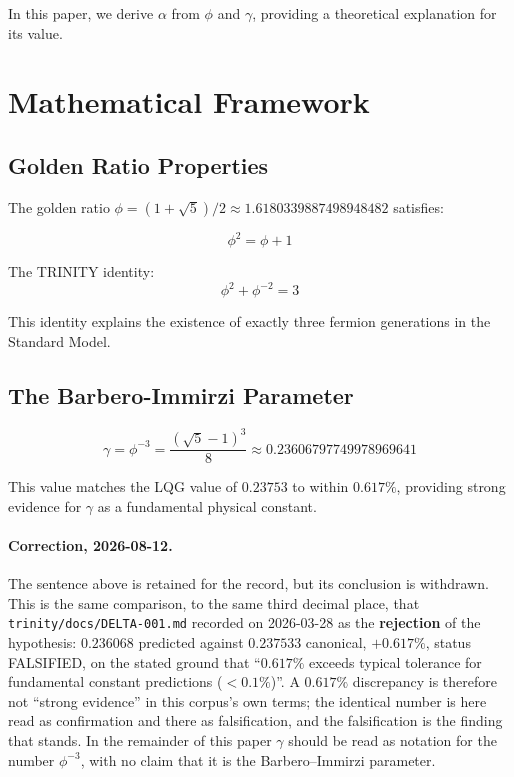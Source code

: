 \documentclass[12pt,a4paper]{article}
\begin{document}
In this paper, we derive $\alpha$ from $\phi$ and $\gamma$, providing a theoretical explanation for its value.

\section{Mathematical Framework}

\subsection{Golden Ratio Properties}

The golden ratio $\phi = (1+\sqrt{5})/2 \approx 1.6180339887498948482$ satisfies:

\begin{equation}
\phi^2 = \phi + 1
\end{equation}

The TRINITY identity:
\begin{equation}
\phi^2 + \phi^{-2} = 3
\end{equation}

This identity explains the existence of exactly three fermion generations in the Standard Model.

\subsection{The Barbero-Immirzi Parameter}

\begin{equation}
\gamma = \phi^{-3} = \frac{(\sqrt{5}-1)^3}{8} \approx 0.23606797749978969641
\end{equation}

This value matches the LQG value of $0.23753$ to within $0.617\%$, providing strong evidence for $\gamma$ as a fundamental physical constant.

\paragraph{Correction, 2026-08-12.} The sentence above is retained for the record, but its conclusion is withdrawn. This is the same comparison, to the same third decimal place, that \texttt{trinity/docs/DELTA-001.md} recorded on 2026-03-28 as the \textbf{rejection} of the hypothesis: $0.236068$ predicted against $0.237533$ canonical, $+0.617\%$, status FALSIFIED, on the stated ground that ``$0.617\%$ exceeds typical tolerance for fundamental constant predictions ($<0.1\%$)''. A $0.617\%$ discrepancy is therefore not ``strong evidence'' in this corpus's own terms; the identical number is here read as confirmation and there as falsification, and the falsification is the finding that stands. In the remainder of this paper $\gamma$ should be read as notation for the number $\phi^{-3}$, with no claim that it is the Barbero--Immirzi parameter.
\end{document}

